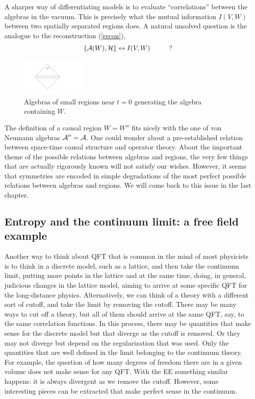 \documentclass[11pt]{article}
\numberwithin{equation}{section}
\newcommand{\be}{\begin{equation}}
\newcommand{\ee}{\end{equation}}
\begin{document}
A sharper way of differentiating models is to evaluate ``correlations'' between the algebras in the vacuum. This is precisely what the mutual information $I(V,W)$ between two spatially separated regions does. A natural unsolved question is the analogue to the reconstruction (\ref{recon}),
\be
\{{\cal A}(W), {\cal H}\}\leftrightarrow I(V,W) \hspace{1cm}?  
\ee

\begin{figure}[t]
\begin{center}  
\includegraphics[width=0.29\textwidth]{causal1.pdf}
\captionsetup{width=0.9\textwidth}
\caption{Algebras of small regions near $t=0$ generating the algebra containing $W$.}
\label{causal1}
\end{center}  
\end{figure}

The definition of a causal region $W=W''$ fits nicely with the one of von Neumann algebras ${\cal A}''={\cal A}$.  One could wonder about a pre-established relation between space-time causal structure and operator theory. About the important theme of the possible relations between algebras and regions, the very few things that are actually rigorously known will not satisfy our wishes. However, it seems that symmetries are encoded in simple degradations of the most perfect possible relations between algebras and regions. We will come back to this issue in the last chapter.    

\subsection{Entropy and the continuum limit: a free field example}

Another way to think about QFT that is common in the mind of most physicists is to think in a discrete model, such as a lattice, and then take the continuum limit, putting more points in the lattice and at the same time, doing, in general, judicious changes in the lattice model,  aiming to arrive at some specific QFT for the long-distance physics. Alternatively, we can think of a theory with a different sort of cutoff, and take the limit by removing the cutoff. There may be many ways to cut off a theory, but all of them should arrive at the same QFT, say, to the same correlation functions. In this process, there may be quantities that make sense for the discrete model but that diverge as the cutoff is removed. Or they may not diverge but depend on the regularization that was used. Only the quantities that are well defined in the limit belonging to the continuum theory. For example, the question of how many degrees of freedom there are in a given volume does not make sense for any QFT. With the EE something similar happens: it is always divergent as we remove the cutoff. However, some interesting pieces can be extracted that make perfect sense in the continuum.    
\end{document}
